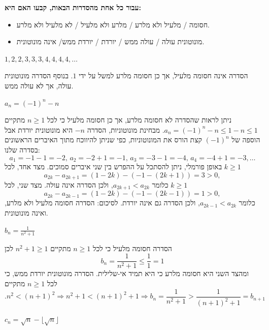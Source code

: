 \textbf{עבור כל אחת מהסדרות הבאות, קבעו האם היא:}
\begin{itemize}
    \item
    חסומה /
 מלעיל ולא מלרע /  מלרע ולא מלעיל  / לא  מלעיל ולא  מלרע.
\item
 מונוטונית עולה / עולה ממש /  יורדת / יורדת ממש/  אינה מונוטונית.
\end{itemize}
\bE{}
\item
$1,2,2,3,3,3,4,4,4,4,\ldots$
\begin{solbox}
    הסדרה אינה חסומה מלעיל, אך כן חסומה מלרע למשל על ידי
    $1$.
    בנוסף הסדרה מונוטונית עולה, אך לא עולה ממש.
\end{solbox}
\item
$a_n=(-1)^n-n$
\begin{solbox}
    ניתן לראות שהסדרה לא חסומה מלרע, אך כן חסומה מלעיל כי
    לכל
    $n\ge1$
    מתקיים
    $a_n=(-1)^n-n\le 1-n\le 1$.
    מבחינת מונוטוניות, הסדרה
    $-n$
    היא מונוטונית יורדת אבל הוספה של
    $(-1)^n$
    קצת הורס את המונוטוניות, כפי שניתן להיווכח מתוך האיברים הראשונים בסדרה שלנו:
    $$a_1=-1-1=-2,\, a_2=-2+1=-1,\, a_3=-3-1=-4,\, a_4=-4+1=-3,\ldots$$
    באופן פורמלי, ניתן להסתכל על ההפרש בין שני איברים סמוכים. מצד אחד, לכל $k\ge1$
    $$a_{2k}-a_{2k+1}=(1-2k)-(-1-(2k+1))=3>0,$$
    כלומר $a_{2k+1}<a_{2k}$, ולכן הסדרה אינה עולה.
    מצד שני, לכל $k\ge1$
    $$a_{2k}-a_{2k-1}=(1-2k)-(-1-(2k-1))=1>0,$$
    כלומר $a_{2k-1}<a_{2k}$, ולכן הסדרה גם אינה יורדת.
    לסיכום: הסדרה חסומה מלעיל ולא מלרע, ואינה מונוטונית.
\end{solbox}
\item
$b_n=\frac{1}{n^2+1}$
\begin{solbox}
    הסדרה חסומה מלעיל כי לכל
    $n\ge1$
    מתקיים
    $ n^2+1\ge 1$
    לכן
    $$b_n=\frac{1}{n^2+1}\le \frac{1}{1}=1$$
  ומהצד השני היא חסומה מלרע כי היא תמיד אי-שלילית.
  הסדרה מונוטונית יורדת ממש, כי לכל
  $n\ge1$
  מתקיים
  $$.n^2< (n+1)^2\Longrightarrow n^2+1< (n+1)^2+1\Longrightarrow b_n=\frac{1}{n^2+1}> \frac{1}{(n+1)^2+1}=b_{n+1}$$
\end{solbox}
\item
$c_n=\sqrt{n}-\lfloor\sqrt{n}\rfloor$

